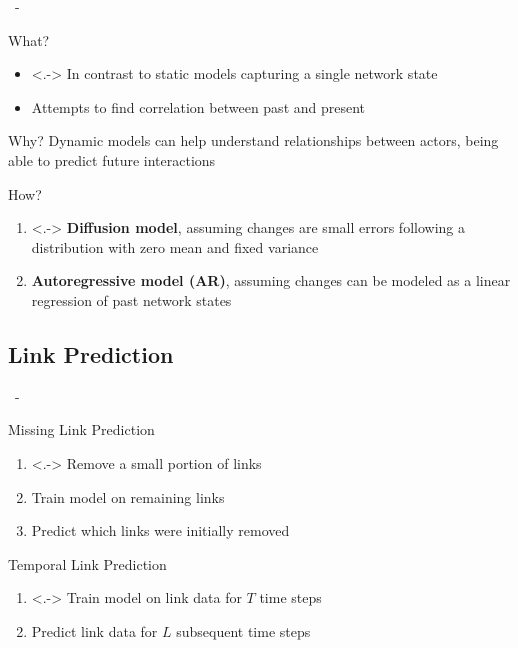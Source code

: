 \documentclass{beamer}
\newenvironment{xframe}
    {\begin{frame}{
        \ifx\insertsubsection\empty
            \strut
        \else\ifx\insertsubsubsection\empty
            \insertsection
        \else
            \insertsection~-~\insertsubsection
        \fi\fi
    }{
        \ifx\insertsubsection\empty
            \insertsection
        \else\ifx\insertsubsubsection\empty
            \insertsubsection
        \else
            \insertsubsubsection
        \fi\fi
    }}
    {\end{frame}}
\newenvironment{xblock}[1]
    {\begin{block}{#1}}
    {\end{block}}
\begin{document}
    \begin{xframe}
        \begin{xblock}{What?}
            \begin{itemize}
                \item<.-> In contrast to static models capturing a single network state
                \item Attempts to find correlation between past and present
            \end{itemize}
        \end{xblock}
        
        \begin{xblock}{Why?}
            Dynamic models can help understand relationships between actors, being able to predict future interactions
        \end{xblock}
        
        \begin{xblock}{How?}
            \begin{enumerate}
                \item<.-> \textbf{Diffusion model}, assuming changes are small errors following a distribution with zero mean and fixed variance
                \item \textbf{Autoregressive model (AR)}, assuming changes can be modeled as a linear regression of past network states
            \end{enumerate}
        \end{xblock}
        
    \end{xframe}
    
    \subsection{Link Prediction}
    
    \begin{xframe}
        \begin{xblock}{Missing Link Prediction}
            \begin{enumerate}
                \item<.-> Remove a small portion of links
                \item Train model on remaining links
                \item Predict which links were initially removed
            \end{enumerate}
        \end{xblock}
        
        \begin{xblock}{Temporal Link Prediction}
            \begin{enumerate}
                \item<.-> Train model on link data for $T$ time steps
                \item Predict link data for $L$ subsequent time steps
            \end{enumerate}
        \end{xblock}
    \end{xframe}
    
\end{document}
